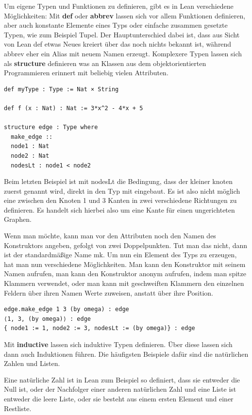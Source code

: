 Um eigene Typen und Funktionen zu definieren, gibt es in Lean verschiedene Möglichkeiten:
Mit \textbf{def} oder \textbf{abbrev} lassen sich vor allem Funktionen definieren, aber auch konstante Elemente eines Typs oder einfache zusammen gesetzte Typen, wie zum Beispiel Tupel.
Der Hauptunterschied dabei ist, dass aus Sicht von Lean def etwas Neues kreiert über das noch nichts bekannt ist, während abbrev eher ein Alias mit neuem Namen erzeugt.
Komplexere Typen lassen sich als \textbf{structure} definieren was an Klassen aus dem objektorientierten Programmieren erinnert mit beliebig vielen Attributen.

\begin{lstlisting}
def myType : Type := Nat × String

def f (x : Nat) : Nat := 3*x^2 - 4*x + 5

structure edge : Type where
  make_edge ::
  node1 : Nat
  node2 : Nat
  nodesLt : node1 < node2
\end{lstlisting}

Beim letzten Beispiel ist mit nodesLt die Bedingung, dass der kleiner knoten zuerst genannt wird, direkt in den Typ mit eingebaut.
Es ist also nicht möglich eine zwischen den Knoten 1 und 3 Kanten in zwei verschiedene Richtungen zu definieren.
Es handelt sich hierbei also um eine Kante für einen ungerichteten Graphen.

Wenn man möchte, kann man vor den Attributen noch den Namen des Konstruktors angeben, gefolgt von zwei Doppelpunkten.
Tut man das nicht, dann ist der standardmäßige Name mk.
Um nun ein Element des Typs zu erzeugen, hat man nun verschiedene Möglichkeiten.
Man kann den Konstruktor mit seinem Namen aufrufen, man kann den Konstruktor anonym aufrufen, indem man spitze Klammern verwendet,
oder man kann mit geschweiften Klammern den einzelnen Feldern über ihren Namen Werte zuweisen, anstatt über ihre Position.

\begin{lstlisting}
edge.make_edge 1 3 (by omega) : edge
⟨1, 3, (by omega)⟩ : edge
{ node1 := 1, node2 := 3, nodesLt := (by omega)} : edge
\end{lstlisting}

Mit \textbf{inductive} lassen sich induktive Typen definieren.
Über diese lassen sich dann auch Induktionen führen.
Die häufigsten Beispiele dafür sind die natürlichen Zahlen und Listen.

Eine natürliche Zahl ist in Lean zum Beispiel so definiert, dass sie entweder die Null ist, oder der Nachfolger einer anderen natürlichen Zahl
und eine Liste ist entweder die leere Liste, oder sie besteht aus einem ersten Element und einer Restliste.

